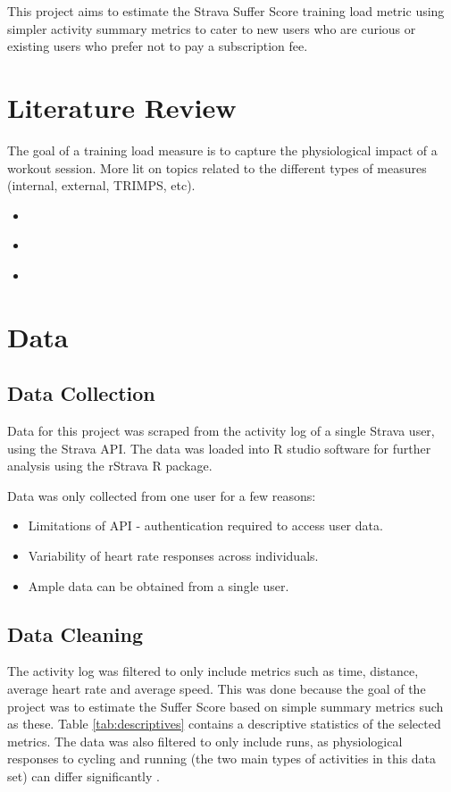 \documentclass[12pt,english]{article}
\begin{document}
This project aims to estimate the Strava Suffer Score training load metric using simpler activity summary metrics to cater to new users who are curious or existing users who prefer not to pay a subscription fee.

\section{Literature Review}\label{sec:litreview}
\noindent The goal of a training load measure is to capture the physiological impact of a workout session. More lit on topics related to the different types of measures (internal, external, TRIMPS, etc).
\begin{itemize}
  \item \cite{bourdon2017monitoring}
  \item \cite{lambert2010measuring}
  \item \cite{roos2013monitoring}
\end{itemize}

\section{Data}\label{sec:data}
\subsection{Data Collection}
Data for this project was scraped from the activity log of a single Strava user, using the Strava API. The data was loaded into R studio software for further analysis using the rStrava R package.

Data was only collected from one user for a few reasons:
\begin{itemize}
    \item Limitations of API - authentication required to access user data.
    \item Variability of heart rate responses across individuals.
    \item Ample data can be obtained from a single user.
\end{itemize}

\subsection{Data Cleaning}
The activity log was filtered to only include metrics such as time, distance, average heart rate and average speed. This was done because the goal of the project was to estimate the Suffer Score based on simple summary metrics such as these. Table \ref{tab:descriptives} contains a descriptive statistics of the selected metrics. The data was also filtered to only include runs, as physiological responses to cycling and running (the two main types of activities in this data set) can differ significantly \cite{hassmen1990perceptual}. 
\end{document}
